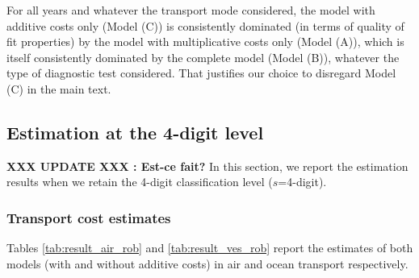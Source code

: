 \documentclass[11pt,twoside, authoryear]{elsarticle}
\begin{document}
For all years and whatever the transport mode considered, the model with additive costs only (Model (C)) is consistently dominated (in terms of quality of fit properties) by the model with multiplicative costs only (Model (A)), which is itself consistently dominated by the complete model (Model (B)), whatever the type of diagnostic test considered. That justifies our choice to disregard Model (C) in the main text.


\subsection{Estimation at the 4-digit level \label{app:4digit}}

\textbf{XXX UPDATE XXX : Est-ce fait?}
In this section, we report the estimation results when we retain the 4-digit classification level ($s$=4-digit).

\subsubsection{Transport cost estimates}


Tables \ref{tab:result_air_rob} and \ref{tab:result_ves_rob} report the estimates of both models (with and without additive costs) in air and ocean transport respectively.
\end{document}
